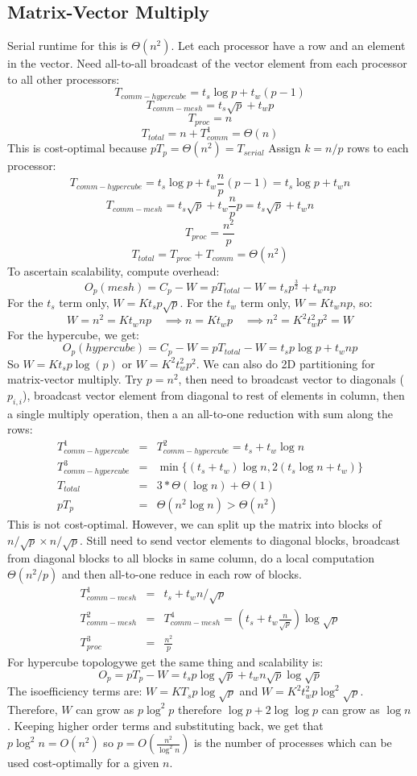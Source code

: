 \documentclass[a4paper,10pt]{article}
\begin{document}
\subsection{Matrix-Vector Multiply}
Serial runtime for this is $\Theta(n^2)$.  Let each processor have a row and an element in the vector.  Need all-to-all broadcast of the vector element from each processor to all other processors:
\[ T_{comm-hypercube} = t_s\log{p} + t_w (p-1)\]
\[ T_{comm-mesh} = t_s\sqrt{p} + t_w p\]
\[ T_{proc} = n \]
\[ T_{total} = n + T^1_{comm} = \Theta(n)\]
This is cost-optimal because $pT_p = \Theta(n^2) = T_{serial}$
Assign $k=n/p$ rows to each processor:
\[ T_{comm-hypercube} = t_s\log{p} + t_w \frac{n}{p}(p-1) = t_s \log{p} + t_w n\]
\[ T_{comm-mesh} = t_s\sqrt{p} + t_w \frac{n}{p} p = t_s \sqrt{p} + t_w n\]
\[ T_{proc} = \frac{n^2}{p} \]
\[T_{total} = T_{proc} + T_{comm} = \Theta(n^2)\]
To ascertain scalability, compute overhead:
\[ O_p(mesh) = C_p - W = pT_{total} - W = t_s p^{\frac{3}{2}} + t_w np\]
For the $t_s$ term only, $W = K t_s p\sqrt{p}$.  For the $t_w$ term only, $W = K t_w np$, so:
\[ W = n^2 = K t_w np \quad\implies n = K t_w p\quad \implies n^2 = K^2t_w^2p^2 = W\]
For the hypercube, we get:
\[ O_p(hypercube) = C_p - W = pT_{total} - W = t_s p\log{p} + t_w np\]
So $W = Kt_s p\log(p)$ or $W = K^2t_w^2 p^2$.  We can also do 2D partitioning for matrix-vector multiply.  Try $p = n^2$, then need to broadcast vector to diagonals ($p_{i,i}$), broadcast vector element from diagonal to rest of elements in column, then a  single multiply operation, then a an all-to-one reduction with sum along the rows:
\begin{eqnarray}
T^1_{comm-hypercube} &=& T^2_{comm-hypercube} = t_s + t_w \log{n} \\
T^3_{comm-hypercube} &=& \min\{(t_s + t_w)\log{n}, 2(t_s\log{n} + t_w)\} \\
T_{total} &=& 3*\Theta(\log{n}) + \Theta(1) \\
pT_p &=& \Theta(n^2\log{n}) > \Theta(n^2)
\end{eqnarray}
This is not cost-optimal. However, we can split up the matrix into blocks of $n/\sqrt{p}\times n/\sqrt{p}$.  Still need to send vector elements to diagonal blocks, broadcast from diagonal blocks to all blocks in same column, do a local computation $\Theta(n^2/p)$ and then all-to-one reduce in each row of blocks.
\begin{eqnarray}
T^1_{comm-mesh} &=& t_s + t_w n/\sqrt{p} \\
T^2_{comm-mesh} &=& T^4_{comm-mesh} = (t_s + t_w \frac{n}{\sqrt{p}})\log{\sqrt{p}} \\
T^3_{proc} &=& \frac{n^2}{p}
\end{eqnarray}
For hypercube topologywe get the same thing and scalability is:
\[O_p = pT_p - W = t_s p\log{\sqrt{p}} + t_w n\sqrt{p}\log{\sqrt{p}}\]
The isoefficiency terms are: $W = KT_s p\log{\sqrt{p}}$ and $W = K^2t_w^2 p\log^2{\sqrt{p}}$.  Therefore, $W$ can grow as $p\log^2{p}$ therefore $\log{p} + 2\log{\log{p}}$ can grow as $\log{n}$.  Keeping higher order terms and substituting back, we get that $p\log^2{n} = O(n^2)$ so $p = O(\frac{n^2}{\log^2{n}})$ is the number of processes which can be used cost-optimally for a given $n$.
\end{document}
